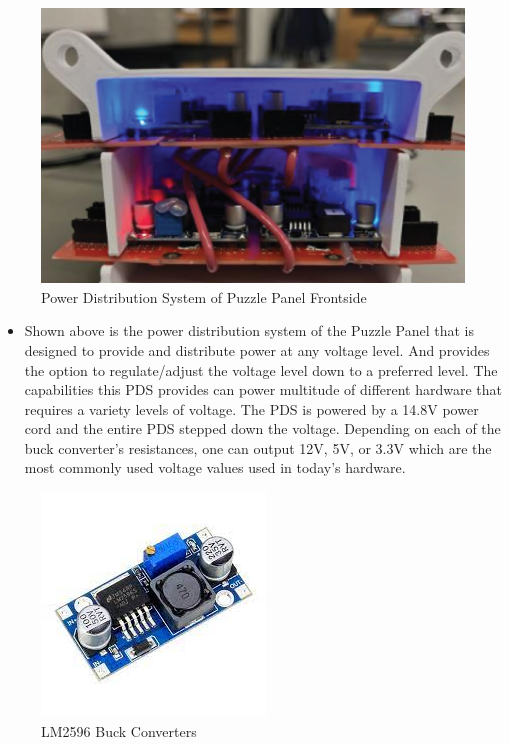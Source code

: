 \documentclass[a4paper, 10pt]{article}
\begin{document}
\begin{figure} [h]
			\centering
			\includegraphics[scale=0.375]{Photos/Puzzle Panel PDS front}
			\caption{Power Distribution System of Puzzle Panel Frontside}
		\end{figure}

\begin{itemize}
\item
	Shown above is the power distribution system of the Puzzle Panel that is designed to provide and distribute power at any voltage level. And provides the option to regulate/adjust the voltage level down to a preferred level. The capabilities this PDS provides can power multitude of different hardware that requires a variety levels of voltage. The PDS is powered by a 14.8V power cord and the entire PDS stepped down the voltage. Depending on each of the buck converter's resistances, one can output 12V, 5V, or 3.3V which are the most commonly used voltage values used in today's hardware.
\end{itemize}

\begin{figure} [h]
			\centering
			\includegraphics[scale=0.4]{Photos/LM2596 bucks}
			\caption{LM2596 Buck Converters}
		\end{figure}
\end{document}
